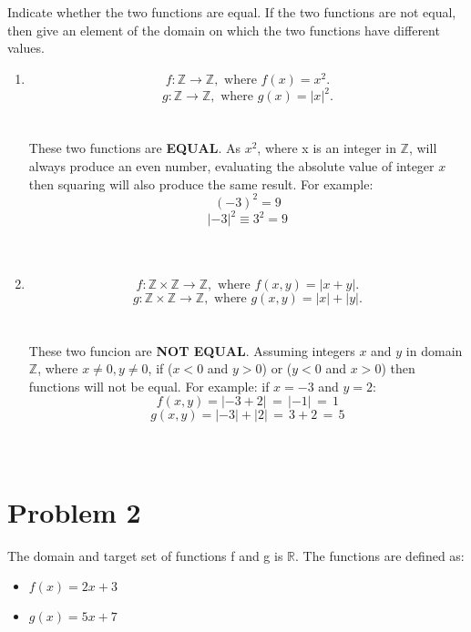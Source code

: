 \documentclass{amsart}
\theoremstyle{definition}
\theoremstyle{Exercise}
\theoremstyle{remark}
\theoremstyle{rule}
\numberwithin{equation}{section}
\newcommand{\Z}{\mathbb Z}
\begin{document}
Indicate whether the two functions are equal. If the two functions are not equal, then give an element of the domain on which the two functions have different values.\\
 \begin{enumerate}[label=(\alph*)]
   \item
\[ f: \Z \to \Z, \text{ where } f(x)= x^2.\]
\[ g: \Z \to \Z, \text{ where } g(x)= |x|^2.\]\\\\
These two functions are \textbf{EQUAL}. As $x^2$, where x is an integer in $\mathbb{Z}$, will always produce an even number, 
evaluating the absolute value of integer $x$ then squaring will also produce the same result. For example:\\
$$(-3)^2 = 9$$
$$|-3|^2 \equiv 3^2 = 9$$
\\\\
\item  \[ f: \Z\times \Z \to \Z, \text{ where } f(x,y)= |x+y|.\]
\[ g: \Z\times \Z \to \Z, \text{ where } g(x,y)= |x|+|y|.\]\\\\
These two funcion are \textbf{NOT EQUAL}. Assuming integers $x$ and $y$ in domain $\mathbb{Z}$, where $x \neq 0, y \neq 0$,
if ($x < 0$ and $y > 0$) or ($y < 0$ and $x > 0$) then functions will not be equal. For example: if $x = -3$ and $y = 2$:\\
$$f(x,y) = |-3 + 2|\,=\,|-1|\,=\,1$$
$$g(x,y) = |-3|+|2|\,=\,3+2\,=\,5$$
\\\\
\end{enumerate}

 \newpage
\vspace*{0.25in}
\section*{Problem 2}

The domain and target set of functions f and g is $\mathbb{R}$. The functions are defined as:
\begin{itemize}
  \item $f(x) = 2x + 3$\\

  \item $g(x) = 5x + 7$\\


\end{itemize}
\end{document}
